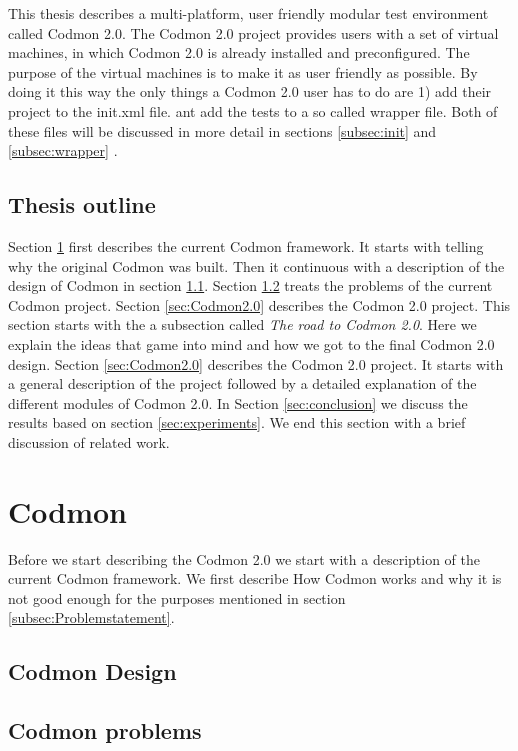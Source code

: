 \documentclass[a4paper,10pt]{scrartcl}
\newcommand{\project}{Codmon 2.0}
\begin{document}
\noindent This thesis describes a multi-platform, user friendly modular test environment called \project{}. The \project{} project provides users with a set of virtual machines,
in which \project{} is already installed and preconfigured. The purpose of the virtual machines is to make it as user friendly as possible. By doing it this way the only things
a \project{} user has to do are 1) add their project  to the init.xml file. ant add the tests to a so called wrapper file. Both of these files will be discussed in more detail in 
sections \ref{subsec:init} and \ref{subsec:wrapper} .


\subsection{Thesis outline}
\label{subsec:Thesisoutline}
Section \ref{sec:codmon} first describes the current Codmon framework. It starts with telling why the original Codmon was built. Then it continuous with a description of the design of Codmon
in section \ref{subsec:CodmonDesign}. Section \ref{subsec:CodmonProblems} treats the problems of the current Codmon project. Section \ref{sec:Codmon2.0} describes the \project{} project. This
section starts with the  a subsection called \emph{The road to \project{}}. Here we explain the ideas that game into mind and how we got to the final \project{} design. Section \ref{sec:Codmon2.0}
describes the \project{} project. It starts with a general description of the project followed by a detailed explanation of the different modules of \project{}. In Section \ref{sec:conclusion} we
discuss the results based on section \ref{sec:experiments}. We end this section with a brief discussion of related work.

\newpage

\section{Codmon}
\label{sec:codmon}
Before we start describing the \project{} we start with a description of the current Codmon framework. We first describe How Codmon works and why it is not good enough for the purposes mentioned
in section \ref{subsec:Problemstatement}. 

\subsection{Codmon Design}
\label{subsec:CodmonDesign}
\subsection{Codmon problems}
\label{subsec:CodmonProblems}
\end{document}
